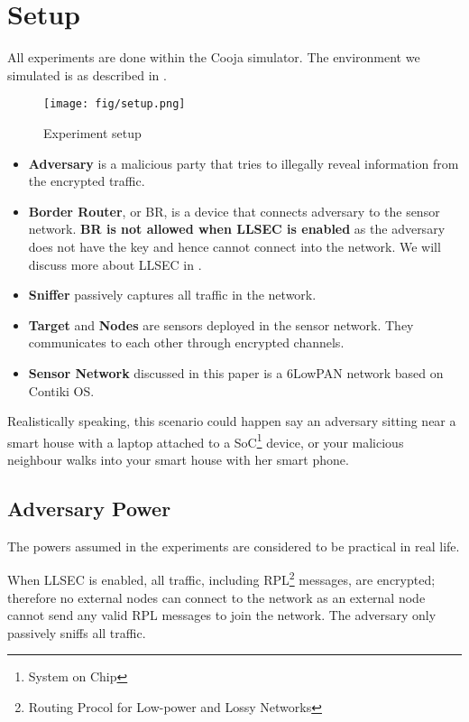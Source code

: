 \chapter{Setup} \label{Chp: Setup}
All experiments are done within the Cooja simulator. The environment we simulated is as described in .

\begin{figure*}
\centering
{
	\texttt{[image: fig/setup.png]}
}
\caption{Experiment setup} \label{fig: Setup}
\end{figure*}

\begin{itemize}
\item{\bf Adversary} is a malicious party that tries to illegally reveal information from the encrypted traffic.
\item{\bf Border Router}, or BR, is a device that connects adversary to the sensor network. \textbf{BR is not allowed when LLSEC is enabled} as the adversary does not have the key and hence cannot connect into the network. We will discuss more about LLSEC in .
\item{\bf Sniffer} passively captures all traffic in the network. 
\item{\bf Target} and {\bf Nodes} are sensors deployed in the sensor network. They communicates to each other through encrypted channels.
\item{\bf Sensor Network} discussed in this paper is a 6LowPAN network based on Contiki OS.
\end{itemize}

Realistically speaking, this scenario could happen say an adversary sitting near a smart house with a laptop attached to a SoC\footnote{System on Chip} device, or your malicious neighbour walks into your smart house with her smart phone.

\section{Adversary Power}
The powers assumed in the experiments are considered to be practical in real life.

When LLSEC is enabled, all traffic, including RPL\footnote{Routing Procol for Low-power and Lossy Networks} messages, are encrypted; therefore no external nodes can connect to the network as an external node cannot send any valid RPL messages to join the network. The adversary only passively sniffs all traffic.

